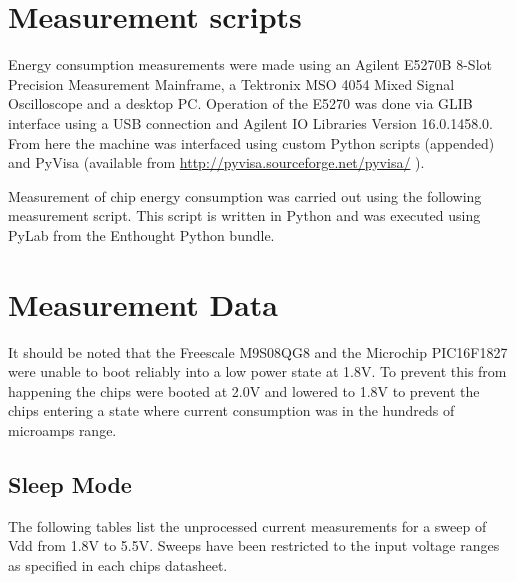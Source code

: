 
\label{Appendix:Measurements}


\section{Measurement scripts}

Energy consumption measurements were made using an Agilent E5270B
8-Slot Precision Measurement Mainframe, a Tektronix MSO 4054 Mixed
Signal Oscilloscope and a desktop PC. Operation of the E5270 was done
via GLIB interface using a USB connection and Agilent IO Libraries
Version 16.0.1458.0. From here the machine was interfaced using custom
Python scripts (appended) and PyVisa (available from \url{http://pyvisa.sourceforge.net/pyvisa/} ).

Measurement of chip energy consumption was carried out using the following
measurement script. This script is written in Python and was executed
using PyLab from the Enthought Python bundle.




\section{Measurement Data}

It should be noted that the Freescale M9S08QG8 and the Microchip PIC16F1827
were unable to boot reliably into a low power state at 1.8V. To prevent
this from happening the chips were booted at 2.0V and lowered to 1.8V
to prevent the chips entering a state where current consumption was
in the hundreds of microamps range.


\subsection{Sleep Mode}

The following tables list the unprocessed current measurements for
a sweep of Vdd from 1.8V to 5.5V. Sweeps have been restricted to the
input voltage ranges as specified in each chips datasheet.

